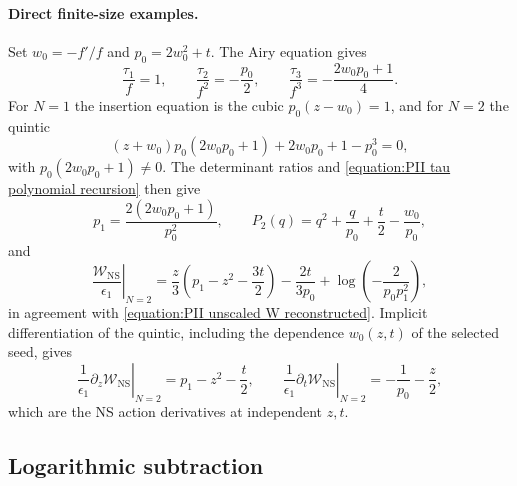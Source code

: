 \documentclass[a4paper,11pt]{article}
\numberwithin{equation}{section}
\begin{document}
\paragraph*{Direct finite-size examples.}
Set $w_{0}=-f'/f$ and $p_{0}=2w_{0}^{2}+t$.  The Airy equation gives
\begin{equation}
\label{equation:PII tau first determinants}
\frac{\tau_{1}}{f}=1,\qquad
\frac{\tau_{2}}{f^{2}}=-\frac{p_{0}}{2},\qquad
\frac{\tau_{3}}{f^{3}}=-\frac{2w_{0}p_{0}+1}{4}.
\end{equation}
For $N=1$ the insertion equation is the cubic $p_{0}(z-w_{0})=1$,
and for $N=2$ the quintic
\begin{equation}
\label{equation:PII tau N2 seed quintic}
(z+w_{0})p_{0}(2w_{0}p_{0}+1)+2w_{0}p_{0}+1-p_{0}^{3}=0,
\end{equation}
with $p_{0}(2w_{0}p_{0}+1)\neq0$.  The determinant ratios and
\eqref{equation:PII tau polynomial recursion} then give
\begin{equation}
\label{equation:PII tau N2 polynomial}
p_{1}=\frac{2(2w_{0}p_{0}+1)}{p_{0}^{2}},
\qquad
P_{2}(q)=q^{2}+\frac{q}{p_{0}}+\frac{t}{2}-\frac{w_{0}}{p_{0}},
\end{equation}
and
\begin{equation}
\label{equation:PII tau N2 action}
\left.\frac{\mathcal{W}_{\mathrm{NS}}}{\epsilon_{1}}\right|_{N=2}
=\frac{z}{3}\left(p_{1}-z^{2}-\frac{3t}{2}\right)
-\frac{2t}{3p_{0}}
+\log{\left(-\frac{2}{p_{0}p_{1}^{2}}\right)},
\end{equation}
in agreement with
\eqref{equation:PII unscaled W reconstructed}.  Implicit
differentiation of the quintic, including the dependence
$w_{0}(z,t)$ of the selected seed, gives
\begin{equation}
\label{equation:PII tau N2 action derivatives}
\left.\frac{1}{\epsilon_{1}}\partial_{z}
\mathcal{W}_{\mathrm{NS}}\right|_{N=2}
=p_{1}-z^{2}-\frac{t}{2},
\qquad
\left.\frac{1}{\epsilon_{1}}\partial_{t}
\mathcal{W}_{\mathrm{NS}}\right|_{N=2}
=-\frac{1}{p_{0}}-\frac{z}{2},
\end{equation}
which are the NS action derivatives at independent $z,t$.

\subsection{Logarithmic subtraction}
\label{appendix:PII log subtraction}
\end{document}
